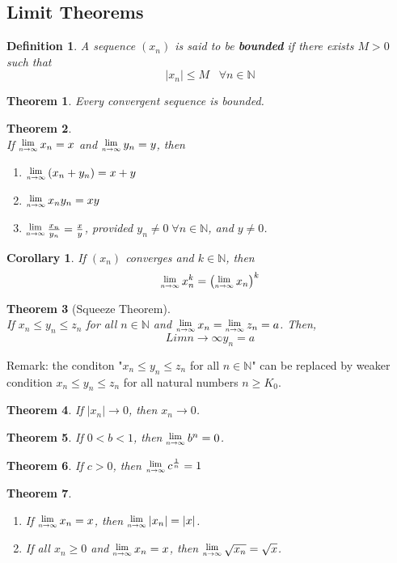\documentclass[12pt]{article}
\newcommand{\Lim}[1]{\raisebox{0.5ex}{\scalebox{0.8}{$\displaystyle \lim_{#1}\;$}}}
\newtheorem{definition}{Definition}[section]
\newtheorem{theorem}{Theorem}[section]
\newtheorem{corollary}{Corollary}[section]
\theoremstyle{definition}
\begin{document}
\subsection{Limit Theorems}
\begin{definition}\normalfont A sequence $(x_n)$ is said to be \textbf{bounded} if there exists $M>0$ such that
\[
|x_n|\leq M\;\;\;\forall n\in\mathbb{N}
\]
\end{definition}
\begin{theorem}\normalfont Every convergent sequence is bounded.\end{theorem}
\begin{theorem}
\hfill\\\normalfont If $\Lim{n\to\infty}x_n=x$ and $\Lim{n\to\infty}y_n = y$, then
\begin{enumerate}
\item $\Lim{n\to\infty}(x_n+y_n)=x+y$
\item $\Lim{n\to\infty} x_n y_n = xy$
\item $\Lim{n\to\infty}\frac{x_n}{y_n}=\frac{x}{y}$, provided $y_n\neq 0\;\forall n\in\mathbb{N}$, and $y\neq 0$.
\end{enumerate}
\end{theorem}
\begin{corollary}\normalfont If $(x_n)$ converges and $k\in\mathbb{N}$, then
\[
\Lim{n\to\infty}x^k_n=\left(\Lim{n\to\infty}x_n\right)^k
\]
\end{corollary}
\begin{theorem}[Squeeze Theorem]
\hfill\\\normalfont If $x_n\leq y_n\leq z_n$ for all $n\in \mathbb{N}$ and $\Lim{n\to \infty}x_n=\Lim{n\to\infty}z_n = a$. Then,
\[
Lim{n\to\infty} y_n =a
\]
\end{theorem}
Remark: the conditon "$x_n\leq y_n\leq z_n$ for all $n\in \mathbb{N}$" can be replaced by weaker condition $x_n\leq y_n \leq z_n$ for all natural numbers $n\geq K_0$.
\begin{theorem}
\normalfont If $|x_n|\to 0$, then $x_n\to 0$.
\end{theorem}
\begin{theorem}
\normalfont If $0<b<1$, then $\Lim{n\to\infty} b^n=0$.
\end{theorem}
\begin{theorem}
\normalfont If $c>0$, then $\Lim{n\to\infty}c^\frac{1}{n}=1$
\end{theorem}
\begin{theorem}
\normalfont
\begin{enumerate}
\item If $\Lim{n\to\infty}x_n= x$, then $\Lim{n\to\infty}|x_n|= |x|$.
\item If all $x_n\geq 0$ and $\Lim{n\to\infty}x_n = x$, then $\Lim{n\to\infty}\sqrt{x_n}=\sqrt{x}$.
\end{enumerate}
\end{theorem}
\end{document}
